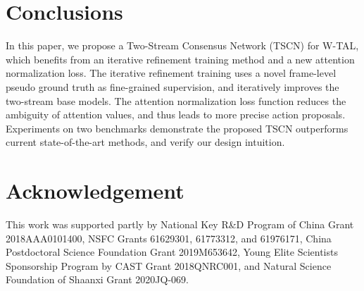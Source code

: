 \documentclass[runningheads]{llncs}
\begin{document}
\section{Conclusions}
In this paper, we propose a Two-Stream Consensus Network (TSCN) for W-TAL, which benefits from an iterative refinement training method and a new attention normalization loss. 
The iterative refinement training uses a novel frame-level pseudo ground truth as fine-grained supervision, and iteratively improves the two-stream base models.
The attention normalization loss function reduces the ambiguity of attention values, and thus leads to more precise action proposals.
Experiments on two benchmarks demonstrate the proposed TSCN outperforms current state-of-the-art methods, and verify our design intuition.


\section*{Acknowledgement}
This work was supported partly by National Key R\&D Program of China Grant 2018AAA0101400, NSFC Grants 61629301, 61773312, and 61976171, China Postdoctoral Science Foundation Grant 2019M653642, Young Elite Scientists Sponsorship Program by CAST Grant 2018QNRC001, and Natural Science Foundation of Shaanxi Grant 2020JQ-069.

\clearpage




\end{document}
